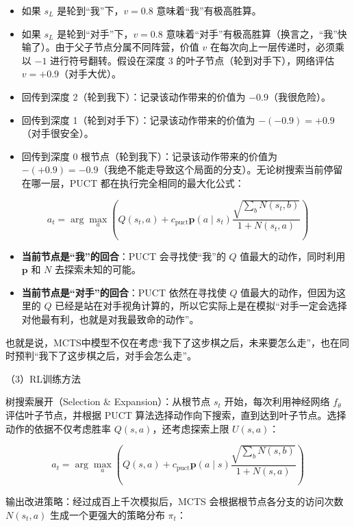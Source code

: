 \begin{itemize}
\item
  如果 \(s_L\) 是轮到``我''下，\(v=0.8\) 意味着``我''有极高胜算。
\item
  如果 \(s_L\) 是轮到``对手''下，\(v=0.8\) 意味着``对手''有极高胜算（换言之，``我''快输了）。由于父子节点分属不同阵营，价值 \(v\) 在每次向上一层传递时，必须乘以 \(-1\) 进行符号翻转。假设在深度 3 的叶子节点（轮到对手下），网络评估 \(v=+0.9\)（对手大优）。
\item
  回传到深度 2（轮到我下）：记录该动作带来的价值为 \(-0.9\)（我很危险）。
\item
  回传到深度 1（轮到对手下）：记录该动作带来的价值为 \(-(-0.9)=+0.9\)（对手很安全）。
\item
{}
  回传到深度 0 根节点（轮到我下）：记录该动作带来的价值为 \(-(+0.9)=-0.9\)（我绝不能走导致这个局面的分支）。无论树搜索当前停留在哪一层，PUCT 都在执行完全相同的最大化公式：
\end{itemize}

\[
a_t=\arg\max_a\left(Q(s_t,a)+c_{\mathrm{puct}}\mathbf{p}(a\mid s_t)\frac{\sqrt{\sum_b N(s_t,b)}}{1+N(s_t,a)}\right)
\]

\begin{itemize}
\tightlist
\item
  \textbf{当前节点是``我''的回合}：PUCT 会寻找使``我''的 \(Q\) 值最大的动作，同时利用 \(\mathbf{p}\) 和 \(N\) 去探索未知的可能。
\item
  \textbf{当前节点是``对手''的回合}：PUCT 依然在寻找使 \(Q\) 值最大的动作，但因为这里的 \(Q\) 已经是站在对手视角计算的，所以它实际上是在模拟``对手一定会选择对他最有利，也就是对我最致命的动作''。
\end{itemize}

也就是说，MCTS中模型不仅在考虑``我下了这步棋之后，未来要怎么走''，也在同时预判``我下了这步棋之后，对手会怎么走''。

（3）RL训练方法

树搜索展开（Selection \& Expansion）：从根节点 \(s_t\) 开始，每次利用神经网络 \(f_\theta\) 评估叶子节点，并根据 PUCT 算法选择动作向下搜索，直到达到叶子节点。选择动作的依据不仅考虑胜率 \(Q(s,a)\)，还考虑探索上限 \(U(s,a)\)：

\[
a_t=\arg\max_a\left(Q(s,a)+c_{\mathrm{puct}}\mathbf{p}(a\mid s)\frac{\sqrt{\sum_b N(s,b)}}{1+N(s,a)}\right)
\]

输出改进策略：经过成百上千次模拟后，MCTS 会根据根节点各分支的访问次数 \(N(s_t,a)\) 生成一个更强大的策略分布 \(\pi_t\)：

